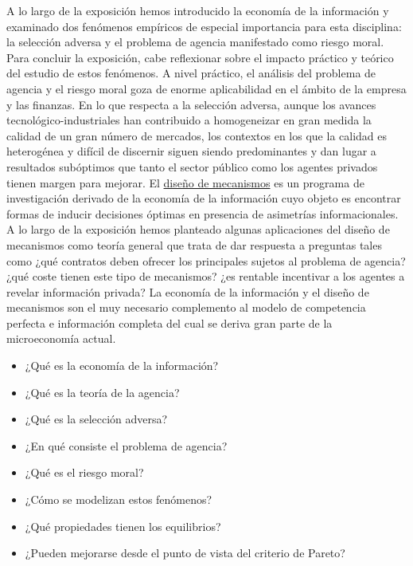 \documentclass{nuevotema}
\begin{document}
A lo largo de la exposición hemos introducido la economía de la información y examinado dos fenómenos empíricos de especial importancia para esta disciplina: la selección adversa y el problema de agencia manifestado como riesgo moral. Para concluir la exposición, cabe reflexionar sobre el impacto práctico y teórico del estudio de estos fenómenos. A nivel práctico, el análisis del problema de agencia y el riesgo moral goza de enorme aplicabilidad en el ámbito de la empresa y las finanzas. En lo que respecta a la selección adversa, aunque los avances tecnológico-industriales han contribuido a homogeneizar en gran medida la calidad de un gran número de mercados, los contextos en los que la calidad es heterogénea y difícil de discernir siguen siendo predominantes y dan lugar a resultados subóptimos que tanto el sector público como los agentes privados tienen margen para mejorar. El \underline{diseño de mecanismos} es un programa de investigación derivado de la economía de la información cuyo objeto es encontrar formas de inducir decisiones óptimas en presencia de asimetrías informacionales. A lo largo de la exposición hemos planteado algunas aplicaciones del diseño de mecanismos como teoría general que trata de dar respuesta a preguntas tales como ¿qué contratos deben ofrecer los principales sujetos al problema de agencia? ¿qué coste tienen este tipo de mecanismos? ¿es rentable incentivar a los agentes a revelar información privada? La economía de la información y el diseño de mecanismos son el muy necesario complemento al modelo de competencia perfecta e información completa del cual se deriva gran parte de la microeconomía actual.


\begin{itemize}
	\item ¿Qué es la economía de la información?
	\item ¿Qué es la teoría de la agencia?
	\item ¿Qué es la selección adversa?
	\item ¿En qué consiste el problema de agencia?
	\item ¿Qué es el riesgo moral?
	\item ¿Cómo se modelizan estos fenómenos?
	\item ¿Qué propiedades tienen los equilibrios?
	\item ¿Pueden mejorarse desde el punto de vista del criterio de Pareto?
\end{itemize}

\esquemacorto
\end{document}
